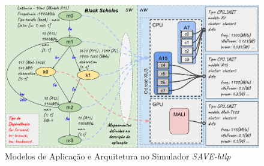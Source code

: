 \documentclass[tese-proposta,nocipinfo]{texufpel}
\begin{document}
\begin{figure}[t]
\centering
		\includegraphics[scale=0.58]{Imagens/Sim_Input}
	\caption{\label{fig:Sim_Input} Modelos de Aplicação e Arquitetura no Simulador \textit{SAVE-htlp}}
\end{figure}
\end{document}
